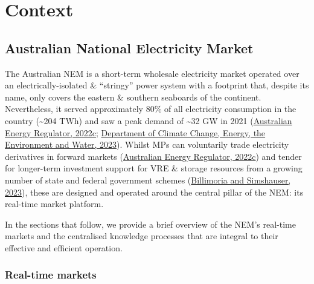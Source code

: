 \documentclass[12pt,a4paper,]{report}
\begin{document}
\hypertarget{sec:info-context}{%
\section{Context}\label{sec:info-context}}

\hypertarget{sec:info-context-nem}{%
\subsection{Australian National Electricity
Market}\label{sec:info-context-nem}}

The Australian NEM is a short-term wholesale electricity market operated
over an electrically-isolated \& ``stringy'' power system with a
footprint that, despite its name, only covers the eastern \& southern
seaboards of the continent. Nevertheless, it served approximately 80\%
of all electricity consumption in the country (\textasciitilde204 TWh)
and saw a peak demand of \textasciitilde32 GW in 2021
(\protect\hyperlink{ref-australianenergyregulatorStateEnergyMarket2022}{Australian
Energy Regulator, 2022c};
\protect\hyperlink{ref-departmentofclimatechangeenergytheenvironmentandwaterNationalElectricityMarket2023}{Department
of Climate Change, Energy, the Environment and Water, 2023}). Whilst MPs
can voluntarily trade electricity derivatives in forward markets
(\protect\hyperlink{ref-australianenergyregulatorStateEnergyMarket2022}{Australian
Energy Regulator, 2022c}) and tender for longer-term investment support
for VRE \& storage resources from a growing number of state and federal
government schemes
(\protect\hyperlink{ref-billimoriaContractDesignStorage2023a}{Billimoria
and Simshauser, 2023}), these are designed and operated around the
central pillar of the NEM: its real-time market platform.

In the sections that follow, we provide a brief overview of the NEM's
real-time markets and the centralised knowledge processes that are
integral to their effective and efficient operation.

\hypertarget{sec:info-context-nem-rtm}{%
\subsubsection{Real-time markets}\label{sec:info-context-nem-rtm}}
\end{document}
